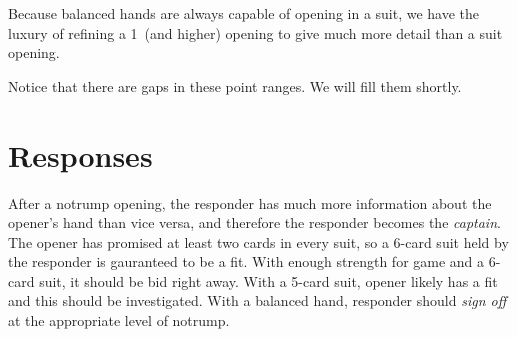 \documentclass[oneside]{memoir}
\begin{document}
Because balanced hands are always capable of opening in a suit, we have the
luxury of refining a 1\NT\ (and higher) opening to give much more detail
than a suit opening.

Notice that there are gaps in these point ranges.  We will fill them shortly.

\section{Responses}
After a notrump opening, the responder has much more information about
the opener's hand than vice versa, and therefore the responder becomes
the \textit{captain}.  The opener has promised at least two cards in every
suit, so a 6-card suit held by the responder is gauranteed to be a fit.  With
enough strength for game and a 6-card suit, it should be bid right away.
With a 5-card suit, opener likely has a fit and this should be investigated.
With a balanced hand, responder should \textit{sign off} at the appropriate
level of notrump.




\end{document}
